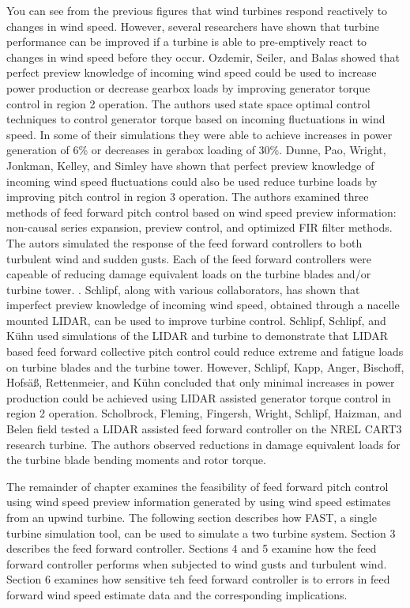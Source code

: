 You can see from the previous figures that wind turbines respond reactively to changes in wind speed. However, several researchers have shown that turbine performance can be improved if a turbine is able to pre-emptively react to changes in wind speed before they occur. Ozdemir, Seiler, and Balas showed that perfect preview knowledge of incoming wind speed could be used to increase power production or decrease gearbox loads by improving generator torque control in region 2 operation. The authors used state space optimal control techniques to control generator torque based on incoming fluctuations in wind speed. In some of their simulations they were able to achieve increases in power generation of 6\% or decreases in gerabox loading of 30\%.\cite{ozdemir2013} Dunne, Pao, Wright, Jonkman, Kelley, and Simley have shown that perfect preview knowledge of incoming wind speed fluctuations could also be used reduce turbine loads by improving pitch control in region 3 operation. The authors examined three methods of feed forward pitch control based on wind speed preview information: non-causal series expansion, preview control, and optimized FIR filter methods. The autors simulated the response of the feed forward controllers to both turbulent wind and sudden gusts. Each of the feed forward controllers were capeable of reducing damage equivalent loads on the turbine blades and/or turbine tower. \cite{dunne2011}. Schlipf, along with various collaborators, has shown that imperfect preview knowledge of incoming wind speed, obtained through a nacelle mounted LIDAR, can be used to improve turbine control.\cite{schlipf2008,schlipf2010,schlipf2011,schlipf2011a,schlipf2013} Schlipf, Schlipf, and K{\"u}hn used simulations of the LIDAR and turbine to demonstrate that LIDAR based feed forward collective pitch control could reduce extreme and fatigue loads on turbine blades and the turbine tower. \cite{schlipf2013} However, Schlipf, Kapp, Anger, Bischoff, Hofs{\"a}{\ss}, Rettenmeier, and K{\"u}hn concluded that only minimal increases in power production could be achieved using LIDAR assisted generator torque control in region 2 operation.\cite{schlipf2011a}  Scholbrock, Fleming, Fingersh, Wright, Schlipf, Haizman, and Belen field tested a LIDAR assisted feed forward controller on the NREL CART3 research turbine. The authors observed reductions in damage equivalent loads for the turbine blade bending moments and rotor torque. \cite{scholbrock2013}

The remainder of chapter examines the feasibility of feed forward pitch control using wind speed preview information generated by using wind speed estimates from an upwind turbine. The following section describes how FAST, a single turbine simulation tool, can be used to simulate a two turbine system. Section 3 describes the feed forward controller. Sections 4 and 5 examine how the feed forward controller performs when subjected to wind gusts and turbulent wind. Section 6 examines how sensitive teh feed forward controller is to errors in feed forward wind speed estimate data and the corresponding implications.



